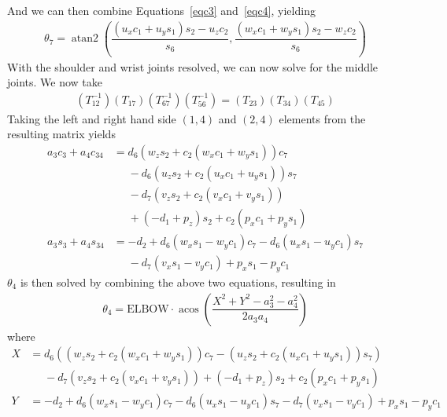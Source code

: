 \documentclass{article}
\DeclareMathOperator{\atantwo}{atan2}
\DeclareMathOperator{\acos}{acos}
\begin{document}
And we can then combine Equations~\ref{eqc3} and~\ref{eqc4}, yielding
\begin{align}
\boxed{\theta_7 = \atantwo \left( \dfrac{\left(u_x c_1 + u_y s_1\right) s_2 - u_z c_2}{s_6},
                                  \dfrac{\left(w_x c_1 + w_y s_1\right) s_2 - w_z c_2}{s_6}\right)}
\end{align}
With the shoulder and wrist joints resolved, we can now solve for the middle joints. We now take
\begin{align*}
\left(T_{12}^{-1} \right) \left(T_{17}\right) \left(T_{67}^{-1}\right) \left(T_{56}^{-1}\right) = \left(T_{23}\right) \left(T_{34}\right) \left(T_{45}\right)
\end{align*}
Taking the left and right hand side $\left(1, 4\right)$ and $\left(2, 4 \right)$ elements from the resulting matrix yields
\begin{align}
a_{3} c_{3} + a_{4} c_{34} &= d_{6} \left(w_z s_{2} + c_{2}\left(w_x c_{1} + w_y s_{1}\right) \right) c_{7} \nonumber \\
                           &\phantom{=} - d_{6} \left(u_z s_{2} + c_{2}\left(u_x c_{1} + u_y s_{1} \right) \right) s_{7}  \nonumber \\
                           &\phantom{=} - d_{7} \left(v_z s_{2} + c_{2}\left(v_x c_{1} + v_y s_{1} \right) \right) \nonumber \\
                           &\phantom{=}+ \left(- d_{1} + p_z\right) s_{2} + c_{2}\left(p_x c_{1} + p_y s_{1}\right) \label{mj1} \\
a_{3} s_{3} + a_{4} s_{34} &= - d_{2} + d_{6} \left(w_x s_{1} - w_y c_{1}\right) c_{7} - d_{6} \left(u_x s_{1} - u_y c_{1}\right) s_{7} \nonumber \\
                           &\phantom{=} - d_{7} \left(v_x s_{1} - v_y c_{1}\right) + p_x s_{1} - p_y c_{1} \label{mj2}
\end{align}
$\theta_4$ is then solved by combining the above two equations, resulting in
\begin{align}
\boxed{\theta_4 = \mbox{ELBOW} \cdot \acos \left( \dfrac{X^2 + Y^2 - a_3^2 - a_4^2}{2 a_3 a_4} \right)}
\end{align}
where
\begin{align*}
X &= d_{6} \left( \left(w_z s_{2} + c_{2}\left(w_x c_{1} + w_y s_{1}\right) \right) c_{7} - \left(u_z s_{2} + c_{2}\left(u_x c_{1} + u_y s_{1} \right) \right) s_{7} \right) \nonumber \\
  &\phantom{=}- d_{7} \left(v_z s_{2} + c_{2}\left(v_x c_{1} + v_y s_{1} \right) \right) + \left(- d_{1} + p_z\right) s_{2} + c_{2}\left(p_x c_{1} + p_y s_{1}\right) \\
Y &= - d_{2} + d_{6} \left(w_x s_{1} - w_y c_{1}\right) c_{7} - d_{6} \left(u_x s_{1} - u_y c_{1}\right) s_{7} - d_{7} \left(v_x s_{1} - v_y c_{1}\right) + p_x s_{1} - p_y c_{1}
\end{align*}
\end{document}
